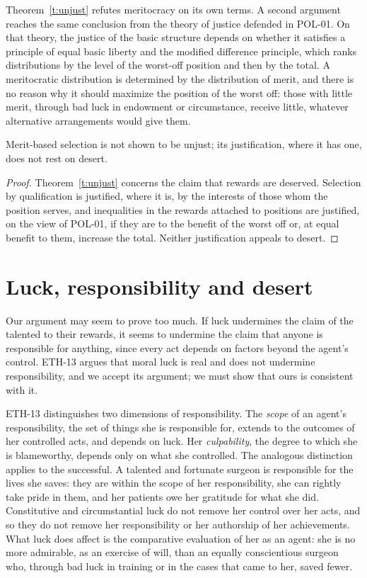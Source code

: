 \documentclass{situationist-preprint}
\begin{document}
Theorem~\ref{t:unjust} refutes meritocracy on its own terms. A second argument reaches the same conclusion from the theory of justice defended in POL-01. On that theory, the justice of the basic structure depends on whether it satisfies a principle of equal basic liberty and the modified difference principle, which ranks distributions by the level of the worst-off position and then by the total. A meritocratic distribution is determined by the distribution of merit, and there is no reason why it should maximize the position of the worst off: those with little merit, through bad luck in endowment or circumstance, receive little, whatever alternative arrangements would give them.

\begin{corollary}\label{c:select}
Merit-based selection is not shown to be unjust; its justification, where it has one, does not rest on desert.
\end{corollary}

\begin{proof}
Theorem~\ref{t:unjust} concerns the claim that rewards are deserved. Selection by qualification is justified, where it is, by the interests of those whom the position serves, and inequalities in the rewards attached to positions are justified, on the view of POL-01, if they are to the benefit of the worst off or, at equal benefit to them, increase the total. Neither justification appeals to desert.
\end{proof}

\section{Luck, responsibility and desert}

Our argument may seem to prove too much. If luck undermines the claim of the talented to their rewards, it seems to undermine the claim that anyone is responsible for anything, since every act depends on factors beyond the agent's control. ETH-13 argues that moral luck is real and does not undermine responsibility, and we accept its argument; we must show that ours is consistent with it.

ETH-13 distinguishes two dimensions of responsibility. The \emph{scope} of an agent's responsibility, the set of things she is responsible for, extends to the outcomes of her controlled acts, and depends on luck. Her \emph{culpability}, the degree to which she is blameworthy, depends only on what she controlled. The analogous distinction applies to the successful. A talented and fortunate surgeon is responsible for the lives she saves: they are within the scope of her responsibility, she can rightly take pride in them, and her patients owe her gratitude for what she did. Constitutive and circumstantial luck do not remove her control over her acts, and so they do not remove her responsibility or her authorship of her achievements. What luck does affect is the comparative evaluation of her as an agent: she is no more admirable, as an exercise of will, than an equally conscientious surgeon who, through bad luck in training or in the cases that came to her, saved fewer.
\end{document}
